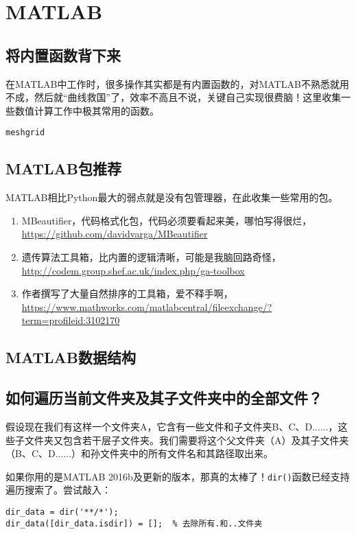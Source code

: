 \chapter{MATLAB}

\section{将内置函数背下来}

在MATLAB中工作时，很多操作其实都是有内置函数的，对MATLAB不熟悉就用不成，然后就“曲线救国”了，效率不高且不说，关键自己实现很费脑！这里收集一些数值计算工作中极其常用的函数。

\texttt{meshgrid}

\section{MATLAB包推荐}

MATLAB相比Python最大的弱点就是没有包管理器，在此收集一些常用的包。

\begin{enumerate}
    \item MBeautifier，代码格式化包，代码必须要看起来美，哪怕写得很烂，\url{https://github.com/davidvarga/MBeautifier}
    \item 遗传算法工具箱，比内置的逻辑清晰，可能是我脑回路奇怪，\url{http://codem.group.shef.ac.uk/index.php/ga-toolbox}
    \item 作者撰写了大量自然排序的工具箱，爱不释手啊，\url{https://www.mathworks.com/matlabcentral/fileexchange/?term=profileid:3102170}
\end{enumerate}

\section{MATLAB数据结构}

\section{如何遍历当前文件夹及其子文件夹中的全部文件？}

假设现在我们有这样一个文件夹A，它含有一些文件和子文件夹B、C、D......，这些子文件夹又包含若干层子文件夹。我们需要将这个父文件夹（A）及其子文件夹（B、C、D......）和孙文件夹中的所有文件名和其路径取出来。

如果你用的是MATLAB 2016b及更新的版本，那真的太棒了！\texttt{dir()}函数已经支持遍历搜索了。尝试敲入：

\begin{verbatim}
dir_data = dir('**/*');
dir_data([dir_data.isdir]) = [];  % 去除所有.和..文件夹
\end{verbatim}

